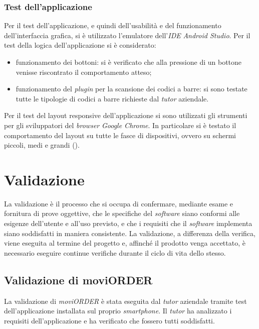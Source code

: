 \subsubsection{Test dell'applicazione}

Per il test dell'applicazione, e quindi dell'usabilità e del funzionamento dell'interfaccia grafica, si è utilizzato l'emulatore dell'\textit{IDE} \textit{Android Studio}. Per il test della logica dell'applicazione si è considerato:
\begin{itemize}
	\item funzionamento dei bottoni: si è verificato che alla pressione di un bottone venisse riscontrato il comportamento atteso;
	\item funzionamento del \textit{plugin} per la scansione dei codici a barre: si sono testate tutte le tipologie di codici a barre richieste dal \textit{tutor} aziendale.
\end{itemize}

Per il test del layout responsive dell'applicazione si sono utilizzati gli strumenti per gli sviluppatori del \textit{browser} \textit{Google Chrome}. In particolare si è testato il comportamento del layout su tutte le fasce di dispositivi, ovvero su schermi piccoli, medi e grandi ().

\section{Validazione}

La validazione è il processo che si occupa di confermare, mediante esame e fornitura di prove oggettive, che le specifiche del \textit{software} siano conformi alle esigenze dell'utente e all'uso previsto, e che i requisiti che il \textit{software} implementa siano soddisfatti in maniera consistente.
La validazione, a differenza della verifica, viene eseguita al termine del progetto e, affinché il prodotto venga accettato, è necessario eseguire continue verifiche durante il ciclo di vita dello stesso.

\subsection{Validazione di moviORDER}

La validazione di \textit{moviORDER} è stata eseguita dal \textit{tutor} aziendale tramite test dell'applicazione installata sul proprio \textit{smartphone}. Il \textit{tutor} ha analizzato i requisiti dell'applicazione e ha verificato che fossero tutti soddisfatti.